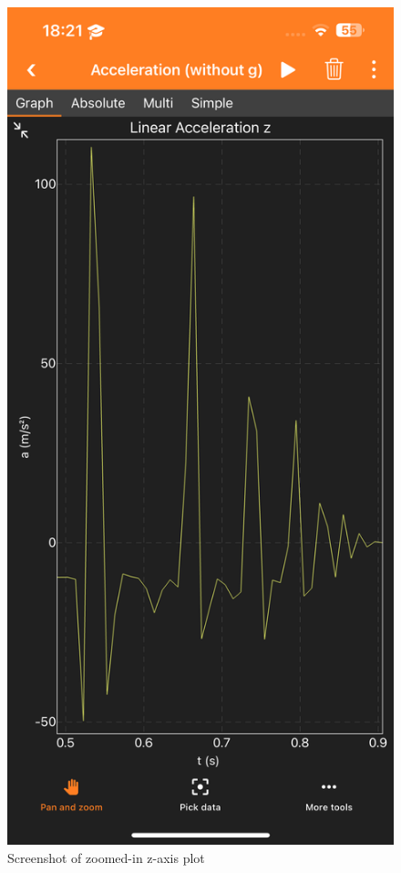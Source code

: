 \documentclass[idxtotoc,hyperref,openany]{labbook} %
\begin{document}
\begin{figure}[H] %
\begin{center}
\includegraphics[width=.7\linewidth]{images/Lab.02/PhoneDropZzoomed.PNG}
\end{center}
\caption{Screenshot of zoomed-in z-axis plot}
\label{fig:Lab02-PhoneDropZzoomed}
\end{figure}
\end{document}
